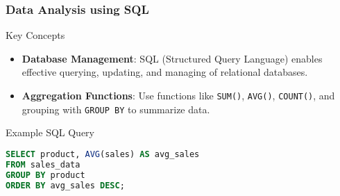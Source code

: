 \documentclass{beamer}
\begin{document}
\begin{frame}[fragile]
    \frametitle{Data Analysis using SQL}
    \begin{block}{Key Concepts}
        \begin{itemize}
            \item \textbf{Database Management}: SQL (Structured Query Language) enables effective querying, updating, and managing of relational databases.
            \item \textbf{Aggregation Functions}: Use functions like \texttt{SUM()}, \texttt{AVG()}, \texttt{COUNT()}, and grouping with \texttt{GROUP BY} to summarize data.
        \end{itemize}
    \end{block}
    
    \begin{block}{Example SQL Query}
        \begin{lstlisting}[language=SQL]
SELECT product, AVG(sales) AS avg_sales
FROM sales_data
GROUP BY product
ORDER BY avg_sales DESC;
        \end{lstlisting}
    \end{block}
\end{frame}
\end{document}
